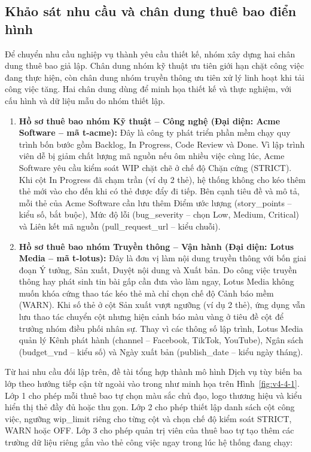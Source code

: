 \subsection{Khảo sát nhu cầu và chân dung thuê bao điển hình}\label{v4-sec-4-1-1}

Để chuyển nhu cầu nghiệp vụ thành yêu cầu thiết kế, nhóm xây dựng hai chân dung thuê bao giả lập. Chân dung nhóm kỹ thuật ưu tiên giới hạn chặt công việc đang thực hiện, còn chân dung nhóm truyền thông ưu tiên xử lý linh hoạt khi tải công việc tăng. Hai chân dung dùng để minh họa thiết kế và thực nghiệm, với cấu hình và dữ liệu mẫu do nhóm thiết lập.

\begin{enumerate}
\def\labelenumi{\arabic{enumi}.}
\item
  \textbf{Hồ sơ thuê bao nhóm Kỹ thuật -- Công nghệ (Đại diện: Acme Software -- mã t-acme):} Đây là công ty phát triển phần mềm chạy quy trình bốn bước gồm Backlog, In Progress, Code Review và Done. Vì lập trình viên dễ bị giảm chất lượng mã nguồn nếu ôm nhiều việc cùng lúc, Acme Software yêu cầu kiểm soát WIP chặt chẽ ở chế độ Chặn cứng (STRICT). Khi cột In Progress đã chạm trần (ví dụ 2 thẻ), hệ thống không cho kéo thêm thẻ mới vào cho đến khi có thẻ được đẩy đi tiếp. Bên cạnh tiêu đề và mô tả, mỗi thẻ của Acme Software cần lưu thêm Điểm ước lượng (story\_\allowbreak{}points -- kiểu số, bắt buộc), Mức độ lỗi (bug\_\allowbreak{}severity -- chọn Low, Medium, Critical) và Liên kết mã nguồn (pull\_\allowbreak{}request\_\allowbreak{}url -- kiểu chuỗi).
\item
  \textbf{Hồ sơ thuê bao nhóm Truyền thông -- Vận hành (Đại diện: Lotus Media -- mã t-lotus):} Đây là đơn vị làm nội dung truyền thông với bốn giai đoạn Ý tưởng, Sản xuất, Duyệt nội dung và Xuất bản. Do công việc truyền thông hay phát sinh tin bài gấp cần đưa vào làm ngay, Lotus Media không muốn khóa cứng thao tác kéo thẻ mà chỉ chọn chế độ Cảnh báo mềm (WARN). Khi số thẻ ở cột Sản xuất vượt ngưỡng (ví dụ 2 thẻ), ứng dụng vẫn lưu thao tác chuyển cột nhưng hiện cảnh báo màu vàng ở tiêu đề cột để trưởng nhóm điều phối nhân sự. Thay vì các thông số lập trình, Lotus Media quản lý Kênh phát hành (channel -- Facebook, TikTok, YouTube), Ngân sách (budget\_\allowbreak{}vnd -- kiểu số) và Ngày xuất bản (publish\_\allowbreak{}date -- kiểu ngày tháng).
\end{enumerate}

Từ hai nhu cầu đối lập trên, đề tài tổng hợp thành mô hình Dịch vụ tùy biến ba lớp theo hướng tiếp cận từ ngoài vào trong như minh họa trên Hình~\ref{fig:v4-4-1}. Lớp 1 cho phép mỗi thuê bao tự chọn màu sắc chủ đạo, logo thương hiệu và kiểu hiển thị thẻ đầy đủ hoặc thu gọn. Lớp 2 cho phép thiết lập danh sách cột công việc, ngưỡng wip\_\allowbreak{}limit riêng cho từng cột và chọn chế độ kiểm soát STRICT, WARN hoặc OFF. Lớp 3 cho phép quản trị viên của thuê bao tự tạo thêm các trường dữ liệu riêng gắn vào thẻ công việc ngay trong lúc hệ thống đang chạy:

